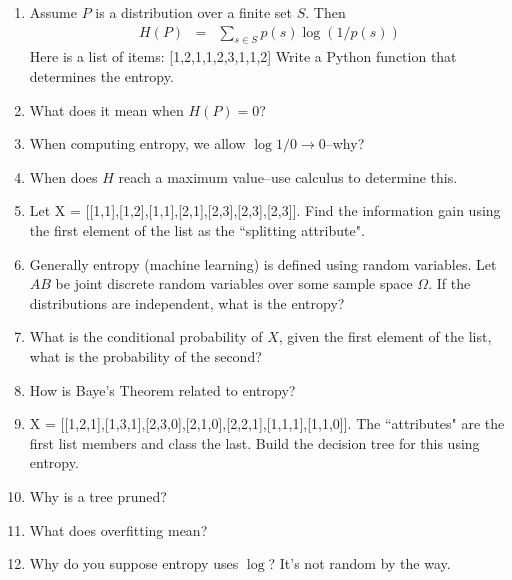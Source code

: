 \documentclass{article}
\begin{document}
\begin{enumerate}
  \item Assume $P$ is a distribution over a finite set $S$.  Then
\begin{eqnarray}
H(P) &=& \sum_{s \in S}p(s)\log (1/p(s))
\end{eqnarray}
Here is a list of items: [1,2,1,1,2,3,1,1,2]
Write a Python function that determines the entropy.
\item What does it mean when $H(P) = 0$?
\item When computing entropy, we allow $\log 1/0 \rightarrow 0$--why?
\item When does $H$ reach a maximum value--use calculus to determine this.
\item Let X = [[1,1],[1,2],[1,1],[2,1],[2,3],[2,3],[2,3]].  Find the information gain using the first element of the list as the ``splitting attribute".
\item Generally entropy  (machine learning) is defined using random variables.  Let $AB$ be joint discrete random variables over some sample space $\Omega$.  If the distributions are independent, what is the entropy?
\item What is the conditional probability of $X$, given the first element of the list, what is the probability of the second?  
\item How is Baye's Theorem related to entropy?
\item X = [[1,2,1],[1,3,1],[2,3,0],[2,1,0],[2,2,1],[1,1,1],[1,1,0]].  The ``attributes" are the first list members and class the last.  Build the decision tree for this using entropy.
\item Why is a tree pruned?
\item What does overfitting mean?
\item Why do you suppose entropy uses $\log$? It's not random by the way.
\end{enumerate}
\end{document}
